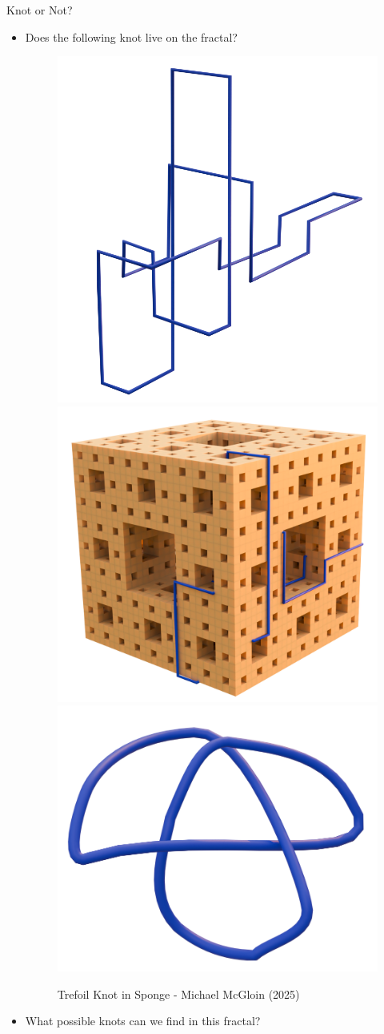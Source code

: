 \begin{frame}{Knot or Not?}
\begin{itemize}
    \item Does the following knot live on the fractal?

    \begin{figure}
        \centering
        \includegraphics[width=0.25\linewidth]{NoCubeTrefoil.png}
        \includegraphics[width=0.3\linewidth]{TreFoilKnot.png}
        \includegraphics[width=0.3\linewidth]{UnravelledTrefoil.png}
        \caption{Trefoil Knot in Sponge - Michael McGloin (2025)}
        \label{fig:enter-label}
    \end{figure}
    \item What possible knots can we find in this fractal?
\end{itemize}
\end{frame}

